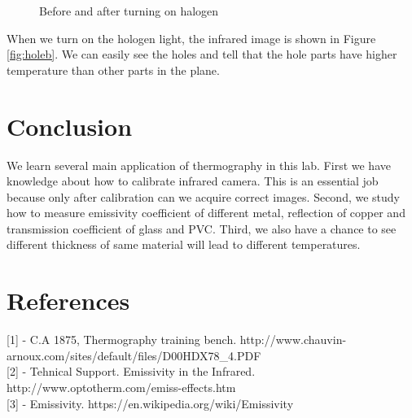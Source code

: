 \documentclass[english]{article}
\begin{document}
\begin{figure}[H]
	\centering
	\caption{Before and after turning on halogen}
	\label{fig:hole}
\end{figure}

When we turn on the hologen light, the infrared image is shown in Figure \ref{fig:holeb}. We can easily see the holes and tell that the hole parts have higher temperature than other parts in the plane.

\section{Conclusion}
We learn several main application of thermography in this lab. First we have knowledge about how to calibrate infrared camera. This is an essential job because only after calibration can we acquire correct images. Second, we study how to measure emissivity coefficient of different metal, reflection of copper and transmission coefficient of glass and PVC. Third, we also have a chance to see different thickness of same material will lead to different temperatures.

\section{References}
{[}1{]} - C.A 1875, Thermography training bench. http://www.chauvin-arnoux.com/sites/default/files/D00HDX78\_4.PDF\\
{[}2{]} - Tehnical Support. Emissivity in the Infrared. http://www.optotherm.com/emiss-effects.htm\\
{[}3{]} - Emissivity. https://en.wikipedia.org/wiki/Emissivity
\end{document}
